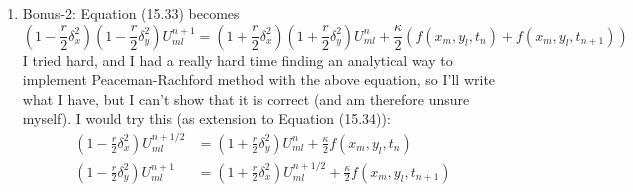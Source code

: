 \documentclass[11pt]{article}
\def\f{\frac }
\begin{document}
\begin{enumerate}
\item Bonus-2: %
Equation (15.33) becomes
\[ \left ( 1 - \f{r}{2} \delta _x ^2 \right ) \left ( 1 - \f{r}{2} \delta _y ^2 \right ) U^{n+1} _{ml} = \left ( 1 +\f{r}{2} \delta _x ^2 \right ) \left ( 1 + \f{r}{2} \delta _y ^2 \right ) U^n _{ml} + \f{\kappa}{2} \left ( f(x_m ,y_l ,t_{n} )  + f(x_m ,y_l ,t_{n+1} ) \right ) \]
I tried hard, and I had a really hard time finding an analytical way to implement Peaceman-Rachford method with the above equation, so I'll write what I have, but I can't show that it is correct (and am therefore unsure myself).
I would try this (as extension to Equation (15.34)):
\begin{align*} \left ( 1 - \f{r}{2} \delta _x ^2 \right ) U^{n+1/2} _{ml} &= \left ( 1 + \f{r}{2} \delta _y ^2 \right ) U^n _{ml} + \f{\kappa}{2} f(x_m ,y_l ,t_{n} )\\
\left ( 1 - \f{r}{2} \delta _y ^2 \right ) U^{n+1} _{ml} &= \left ( 1 +\f{r}{2} \delta _x ^2 \right ) U^{n+1/2} _{ml} + \f{\kappa}{2} f(x_m ,y_l ,t_{n+1} ) \end{align*}

\end{enumerate}
\end{document}
